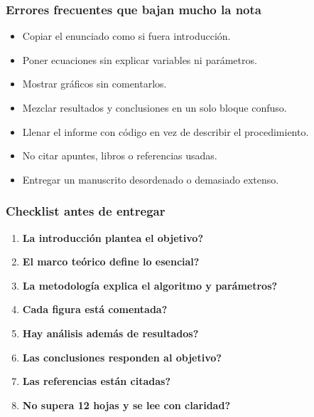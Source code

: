 \begin{frame}
\frametitle{Errores frecuentes que bajan mucho la nota}
\begin{itemize}
    \item Copiar el enunciado como si fuera introducci\'on.
    \item Poner ecuaciones sin explicar variables ni par\'ametros.
    \item Mostrar gr\'aficos sin comentarlos.
    \item Mezclar resultados y conclusiones en un solo bloque confuso.
    \item Llenar el informe con c\'odigo en vez de describir el procedimiento.
    \item No citar apuntes, libros o referencias usadas.
    \item Entregar un manuscrito desordenado o demasiado extenso.
\end{itemize}
\end{frame}

\begin{frame}
\frametitle{Checklist antes de entregar}
\begin{enumerate}
    \item \textbf{\textquestiondown{}La introducci\'on plantea el objetivo?}
    \item \textbf{\textquestiondown{}El marco te\'orico define lo esencial?}
    \item \textbf{\textquestiondown{}La metodolog\'ia explica el algoritmo y par\'ametros?}
    \item \textbf{\textquestiondown{}Cada figura est\'a comentada?}
    \item \textbf{\textquestiondown{}Hay an\'alisis adem\'as de resultados?}
    \item \textbf{\textquestiondown{}Las conclusiones responden al objetivo?}
    \item \textbf{\textquestiondown{}Las referencias est\'an citadas?}
    \item \textbf{\textquestiondown{}No supera 12 hojas y se lee con claridad?}
\end{enumerate}
\end{frame}


